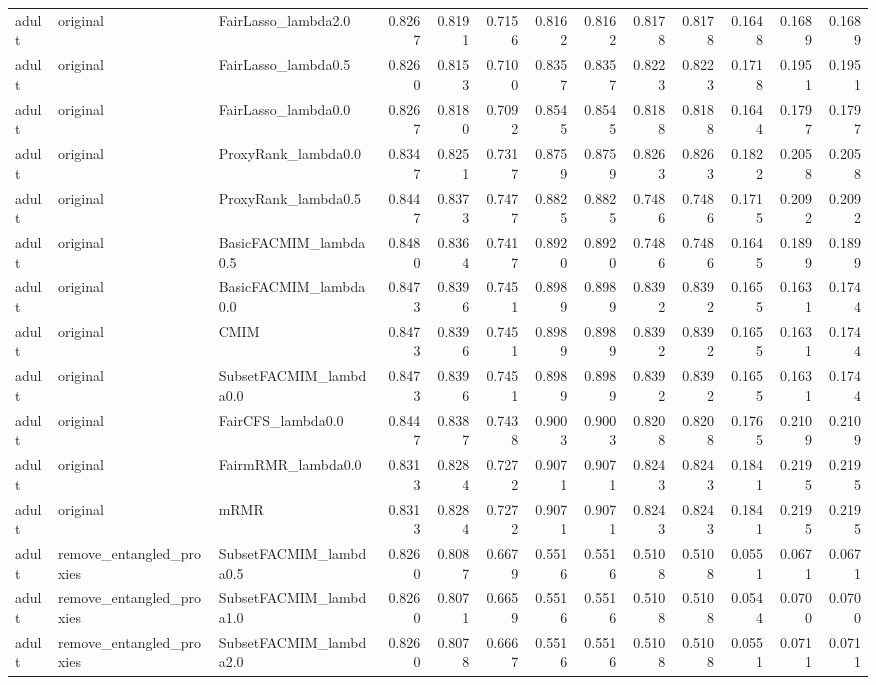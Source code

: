 \begin{tabular}{lllrrrrrrrrrr}
adult & original & FairLasso_lambda2.0 & 0.8267 & 0.8191 & 0.7156 & 0.8162 & 0.8162 & 0.8178 & 0.8178 & 0.1648 & 0.1689 & 0.1689 \\
adult & original & FairLasso_lambda0.5 & 0.8260 & 0.8153 & 0.7100 & 0.8357 & 0.8357 & 0.8223 & 0.8223 & 0.1718 & 0.1951 & 0.1951 \\
adult & original & FairLasso_lambda0.0 & 0.8267 & 0.8180 & 0.7092 & 0.8545 & 0.8545 & 0.8188 & 0.8188 & 0.1644 & 0.1797 & 0.1797 \\
adult & original & ProxyRank_lambda0.0 & 0.8347 & 0.8251 & 0.7317 & 0.8759 & 0.8759 & 0.8263 & 0.8263 & 0.1822 & 0.2058 & 0.2058 \\
adult & original & ProxyRank_lambda0.5 & 0.8447 & 0.8373 & 0.7477 & 0.8825 & 0.8825 & 0.7486 & 0.7486 & 0.1715 & 0.2092 & 0.2092 \\
adult & original & BasicFACMIM_lambda0.5 & 0.8480 & 0.8364 & 0.7417 & 0.8920 & 0.8920 & 0.7486 & 0.7486 & 0.1645 & 0.1899 & 0.1899 \\
adult & original & BasicFACMIM_lambda0.0 & 0.8473 & 0.8396 & 0.7451 & 0.8989 & 0.8989 & 0.8392 & 0.8392 & 0.1655 & 0.1631 & 0.1744 \\
adult & original & CMIM & 0.8473 & 0.8396 & 0.7451 & 0.8989 & 0.8989 & 0.8392 & 0.8392 & 0.1655 & 0.1631 & 0.1744 \\
adult & original & SubsetFACMIM_lambda0.0 & 0.8473 & 0.8396 & 0.7451 & 0.8989 & 0.8989 & 0.8392 & 0.8392 & 0.1655 & 0.1631 & 0.1744 \\
adult & original & FairCFS_lambda0.0 & 0.8447 & 0.8387 & 0.7438 & 0.9003 & 0.9003 & 0.8208 & 0.8208 & 0.1765 & 0.2109 & 0.2109 \\
adult & original & FairmRMR_lambda0.0 & 0.8313 & 0.8284 & 0.7272 & 0.9071 & 0.9071 & 0.8243 & 0.8243 & 0.1841 & 0.2195 & 0.2195 \\
adult & original & mRMR & 0.8313 & 0.8284 & 0.7272 & 0.9071 & 0.9071 & 0.8243 & 0.8243 & 0.1841 & 0.2195 & 0.2195 \\
adult & remove_entangled_proxies & SubsetFACMIM_lambda0.5 & 0.8260 & 0.8087 & 0.6679 & 0.5516 & 0.5516 & 0.5108 & 0.5108 & 0.0551 & 0.0671 & 0.0671 \\
adult & remove_entangled_proxies & SubsetFACMIM_lambda1.0 & 0.8260 & 0.8071 & 0.6659 & 0.5516 & 0.5516 & 0.5108 & 0.5108 & 0.0544 & 0.0700 & 0.0700 \\
adult & remove_entangled_proxies & SubsetFACMIM_lambda2.0 & 0.8260 & 0.8078 & 0.6667 & 0.5516 & 0.5516 & 0.5108 & 0.5108 & 0.0551 & 0.0711 & 0.0711 \\

\end{tabular}
